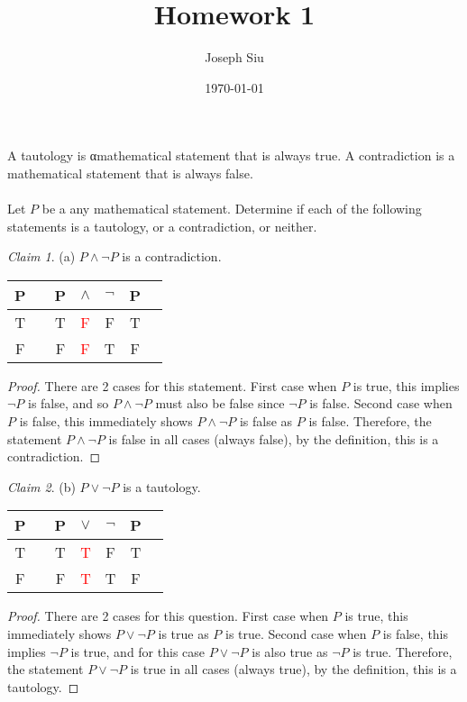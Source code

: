 \documentclass{homework}
\author{Joseph Siu}
\date{\today}
\title{Homework 1}
\theoremstyle{remark}
\newtheorem*{claim}{Claim}
\newcommand{\?}{\stackrel{?}{=}}
\begin{document}
 \maketitle


\question A tautology is αmathematical statement that is always true. A contradiction is a mathematical statement that is always false.\\\\Let $P$ be a any mathematical statement. Determine if each of the following statements is a tautology, or a contradiction, or neither.\\

\begin{claim}
(a)   $P\wedge\neg P$ is a contradiction.
\end{claim}

\begin{center}
    \begin{tabular}{@{ }c | c@{ }@{ }c@{ }@{ }c@{ }@{ }c@{ }@{ }c@{ }@{ }c}
P &  & P & $\land$ & $\lnot$ & P & \\
\hline 
T &  & T & \textcolor{red}{F} & F & T & \\
F &  & F & \textcolor{red}{F} & T & F & \\
\end{tabular}
\end{center}
\begin{proof}
    There are 2 cases for this statement. First case when $P$ is true, this implies $\neg P$ is false, and so $P\land\neg P$ must also be false since $\neg P$ is false. Second case when $P$ is false, this immediately shows $P\land\neg P$ is false as $P$ is false. Therefore, the statement $P\land\neg P$ is false in all cases (always false), by the definition, this is a contradiction.
\end{proof}


\begin{claim}
(b) $P\lor\lnot P$ is a tautology.
\end{claim}

\begin{center}
\begin{tabular}{@{ }c | c@{ }@{ }c@{ }@{ }c@{ }@{ }c@{ }@{ }c@{ }@{ }c}
P &  & P & $\lor$ & $\lnot$ & P & \\
\hline 
T &  & T & \textcolor{red}{T} & F & T & \\
F &  & F & \textcolor{red}{T} & T & F & \\
\end{tabular}
\end{center}
\begin{proof}
    There are 2 cases for this question. First case when $P$ is true, this immediately shows $P\lor\neg P$ is true as $P$ is true. Second case when $P$ is false, this implies $\neg P$ is true, and for this case $P\lor\neg P$ is also true as $\neg P$ is true. Therefore, the statement $P\lor\neg P$ is true in all cases (always true), by the definition, this is a tautology. 
\end{proof}
\end{document}
